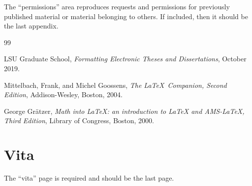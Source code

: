 The ``permissions'' area reproduces requests and permissions for previously
published material or material belonging to others. If included, then it
should be the last appendix.


\backmatter


\begin{thebibliography}{99}

 LSU Graduate School,
  \textit{Formatting Electronic Theses and Dissertations}, October 2019.

 Mittelbach, Frank, and Michel Goossens,
{\em The \LaTeX\  Companion, Second Edition},
Addison-Wesley, Boston, 2004.

 George Gr\"{a}tzer,
{\em Math into \LaTeX: an introduction to LaTeX and AMS-LaTeX, Third Edition},
Library of Congress, Boston, 2000.

\end{thebibliography}


\chapter{Vita}

The ``vita'' page is required and should be the last page.


